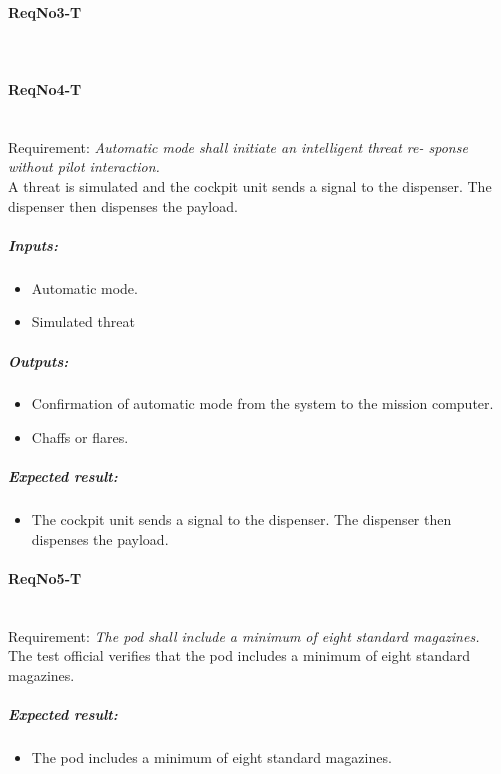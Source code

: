 \paragraph{ReqNo3-T}\mbox{}\\ %


\paragraph{ReqNo4-T}\mbox{}\\ %
Requirement: \textit{Automatic mode shall initiate an intelligent threat re-
sponse without pilot interaction.}\\
A threat is simulated and the cockpit unit sends a signal to the dispenser. The dispenser then dispenses the payload.
\\
	\subparagraph{Inputs:}
	\begin{itemize}
	\item Automatic mode.
	\item Simulated threat
	\end{itemize}
	\subparagraph{Outputs:}
	\begin{itemize}
	\item Confirmation of automatic mode from the system to the mission computer.
	\item Chaffs or flares.
	\end{itemize}
	\subparagraph{Expected result:}
	\begin{itemize}
	\item The cockpit unit sends a signal to the dispenser. The dispenser then dispenses the payload.
	\end{itemize}



\paragraph{ReqNo5-T}\mbox{}\\ %
Requirement: \textit{The pod shall include a minimum of eight standard magazines.}\\

The test official verifies that the pod includes a minimum of eight standard magazines.

\subparagraph{Expected result:}
	\begin{itemize}
	\item The pod includes a minimum of eight standard magazines.
	\end{itemize}

